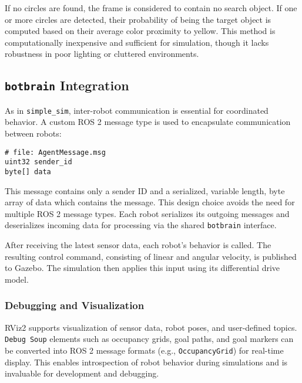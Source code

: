 If no circles are found, the frame is considered to contain no search object. If one or more circles are detected, their probability of being the target object is computed based on their average color proximity to yellow. This method is computationally inexpensive and sufficient for simulation, though it lacks robustness in poor lighting or cluttered environments.

\subsection{\texttt{botbrain} Integration}
\label{sub:Botbrain_integration}
As in \texttt{simple\_sim}, inter-robot communication is essential for coordinated behavior. A custom ROS 2 message type is used to encapsulate communication between robots:

\begin{verbatim}
# file: AgentMessage.msg
uint32 sender_id
byte[] data
\end{verbatim}

This message contains only a sender ID and a serialized, variable length, byte array of data which contains the message. This design choice avoids the need for multiple ROS 2 message types. Each robot serializes its outgoing messages and deserializes incoming data for processing via the shared \texttt{botbrain} interface.

After receiving the latest sensor data, each robot's behavior is called. The resulting control command, consisting of linear and angular velocity, is published to Gazebo. The simulation then applies this input using its differential drive model.


\subsubsection{Debugging and Visualization}
\label{sec:debugging_rviz}
RViz2 supports visualization of sensor data, robot poses, and user-defined topics. \texttt{Debug Soup} elements such as occupancy grids, goal paths, and goal markers can be converted into ROS 2 message formats (e.g., \texttt{OccupancyGrid}) for real-time display. This enables introspection of robot behavior during simulations and is invaluable for development and debugging.
